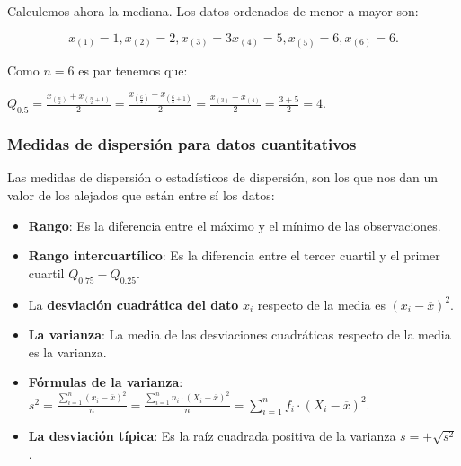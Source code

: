 \begin{frame}

Calculemos ahora la mediana. Los datos ordenados de menor a mayor son:


$$x_{(1)}=1, x_{(2)}=2, x_{(3)}=3 x_{(4)}= 5, x_{(5)}=6, x_{(6)}=6.$$


Como $n=6$ es par  tenemos que:

$Q_{0.5}=\frac{x_{\left(\frac{n}{2}\right)}+x_{\left(\frac{n}{2}+1\right)}}{2} =\frac{x_{\left(\frac{6}{2}\right)}+x_{\left(\frac{6}{2}+1\right)}}{2} =
\frac{x_{(3)}+x_{(4)}}{2} =\frac{3+5}{2}=4.$
\end{frame}

\begin{frame}
\frametitle{Medidas de dispersión  para datos cuantitativos}
Las medidas de dispersión o estadísticos de dispersión, son los que nos dan un valor de los alejados que están entre sí los datos:
\begin{itemize}
\item \textbf{Rango}: Es la diferencia entre el máximo y el mínimo de las observaciones.
\item \textbf{Rango intercuartílico}: Es la diferencia entre el tercer cuartil y el primer cuartil $Q_{0.75}-Q_{0.25}$.
\end{itemize}
\end{frame}

\begin{frame}
\begin{itemize}
\item La \textbf{desviación cuadrática del dato} $x_i$ respecto de la media es $(x_i-\overline{x})^2$.
\item \textbf{La varianza}:  La media de las desviaciones cuadráticas respecto de la media es la varianza.
\item \textbf{Fórmulas de la varianza}:
 $s^2=\frac{\sum_{i=1}^n (x_i-\overline{x})^2}{n}=\frac{\sum_{i=1}^n n_i\cdot (X_i-\overline{x})^2}{n}=\sum_{i=1}^n f_i\cdot (X_i-\overline{x})^2.$
\item \textbf{La desviación típica}: Es la raíz cuadrada positiva de la varianza $s=+\sqrt{s^2}$.

\end{itemize}
\end{frame}

